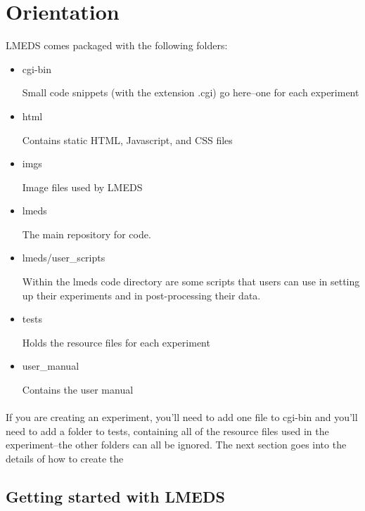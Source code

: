 
\section{Orientation}

LMEDS comes packaged with the following folders:

\begin{itemize}
\item cgi-bin

Small code snippets (with the extension .cgi) go here--one for each experiment

\item html

Contains static HTML, Javascript, and CSS files

\item imgs

Image files used by LMEDS

\item lmeds

The main repository for code.

\item lmeds/user\_scripts

Within the lmeds code directory are some scripts that users can use in setting up their experiments and in post-processing their data.

\item tests

Holds the resource files for each experiment

\item user\_manual

Contains the user manual

\end{itemize}

\paragraph{}

If you are creating an experiment, you'll need to add one file to cgi-bin and you'll need to add a folder to tests, containing all of the resource files used in the experiment--the other folders can all be ignored. The next section goes into the details of how to create the 

\subsection{Getting started with LMEDS}

